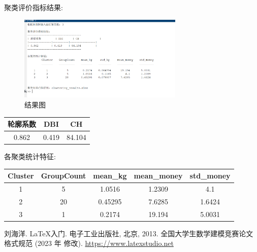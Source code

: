 \documentclass{cumcmthesis}
\begin{document}
聚类评价指标结果:
\begin{figure}[H]
    \centering
    \includegraphics[width=0.7\textwidth]{结果.png}
    \caption{结果图}
\end{figure}

\begin{table}[H]
    \centering
    \begin{tabular}{c c c}
    \toprule
    轮廓系数 & DBI & CH \\
    \midrule
    0.862 & 0.419 & 84.104 \\
    \bottomrule
    \end{tabular}
\end{table}

各聚类统计特征:
\begin{table}[H]
    \centering
    \begin{tabular}{c c c c c}
    \toprule
    Cluster & GroupCount & mean\_kg & mean\_money & std\_money \\
    \midrule
    1 & 5 & 1.0516 & 1.2309 & 4.1 \\
    2 & 20 & 0.45295 & 7.6285 & 1.6424 \\
    3 & 1 & 0.2174 & 19.194 & 5.0031 \\
    \bottomrule
    \end{tabular}
\end{table}

\begin{thebibliography}{9}%
    刘海洋.
    \newblock \LaTeX {}入门\allowbreak[J].
    \newblock 电子工业出版社, 北京, 2013.
    全国大学生数学建模竞赛论文格式规范 (2023 年 修改).
     \url{https://www.latexstudio.net}
\end{thebibliography}
\end{document}
